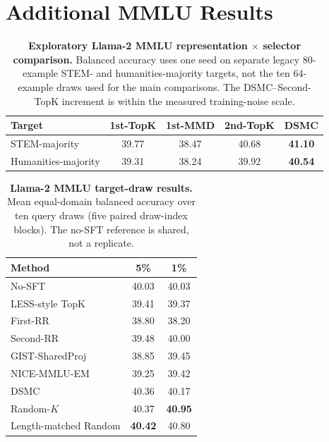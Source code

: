 \documentclass{article}
\newcommand{\method}{\textsc{DSMC}}
\begin{document}
\section{Additional MMLU Results}
\label{app:mmlu}

\begin{table}[h]
\caption{\textbf{Exploratory Llama-2 MMLU representation $\times$ selector
comparison.} Balanced accuracy uses one seed on separate legacy 80-example
STEM- and humanities-majority targets, not the ten 64-example draws used for
the main comparisons. The DSMC--Second-TopK increment is within the measured
training-noise scale.}
\label{tab:attribution}
\centering
\small
\begin{tabular}{lcccc}
\toprule
Target & 1st-TopK & 1st-MMD & 2nd-TopK & \method{} \\
\midrule
STEM-majority & 39.77 & 38.47 & 40.68 & \textbf{41.10} \\
Humanities-majority & 39.31 & 38.24 & 39.92 & \textbf{40.54} \\
\bottomrule
\end{tabular}
\end{table}

\begin{table}[h]
\caption{\textbf{Llama-2 MMLU target-draw results.} Mean equal-domain balanced
accuracy over ten query draws (five paired draw-index blocks). The no-SFT
reference is shared, not a replicate.}
\label{tab:mmlu_main}
\centering
\small
\begin{tabular}{lcc}
\toprule
Method & 5\% & 1\% \\
\midrule
No-SFT & 40.03 & 40.03 \\
LESS-style TopK & 39.41 & 39.37 \\
First-RR & 38.80 & 38.20 \\
Second-RR & 39.48 & 40.00 \\
GIST-SharedProj & 38.85 & 39.45 \\
NICE-MMLU-EM & 39.25 & 39.42 \\
\method{} & 40.36 & 40.17 \\
Random-$K$ & 40.37 & \textbf{40.95} \\
Length-matched Random & \textbf{40.42} & 40.80 \\
\bottomrule
\end{tabular}
\end{table}
\end{document}
